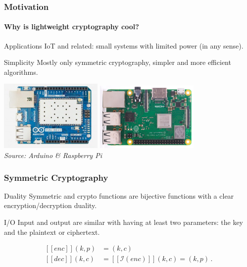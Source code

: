 \documentclass{beamer}
\def\enc{\ensuremath{\mathit{enc}}}
\def\dec{\ensuremath{\mathit{dec}}}
\newcommand{\inv}[1]{\ensuremath{\mathcal{I}(#1)}}
\newcommand{\exe}[1]{\ensuremath{[\![#1]\!]}}
\begin{document}
\addtocounter{page}{1}
\begin{frame}
\addtocounter{page}{-1}
\frametitle{Motivation}
\framesubtitle{\hspace{5mm}Why is lightweight cryptography cool?} 


\begin{block}{Applications}
IoT and related: small systems with limited power (in any sense).
\end{block}

\begin{block}{Simplicity}
Mostly only symmetric cryptography, simpler and more efficient algorithms.
\end{block}

\begin{center}
\includegraphics[width=5cm]{arduino_yun.jpg}%
\includegraphics[width=5cm]{raspi.jpg}%
\\
\textit{\footnotesize{Source: Arduino \& Raspberry Pi}}

\end{center}

\end{frame}



\addtocounter{page}{1}
\begin{frame}
\addtocounter{page}{-1}
\frametitle{Symmetric Cryptography}

\pause
\begin{block}{Duality}
Symmetric and crypto functions are bijective functions with a clear encryption/decryption duality.
\end{block}

\pause
\begin{block}{I/O}
Input and output are similar with having at least two parameters: the key and the plaintext or ciphertext.
\end{block}

\pause
\begin{block}{}
\begin{align*}
\exe{\enc}(k,p) &= (k,c) \\
\exe{\dec}(k,c) &= \exe{\inv{\enc}}(k,c) = (k,p) \,.
\end{align*}
\end{block}

\end{frame}
\end{document}
